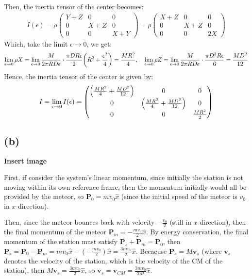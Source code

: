 \documentclass{article}
\DeclarePairedDelimiter{\paran}{(}{)}%
\newcommand{\bv}{\textbf{v}} %
\newcommand{\bP}{\textbf{P}} %
\begin{document}
Then, the inertia tensor of the center becomes:
\begin{align}
    I(\epsilon)=\rho\begin{pmatrix}
        Y+Z&0&0\\
        0&X+Z&0\\
        0&0&X+Y
    \end{pmatrix}=\rho\begin{pmatrix}
        X+Z&0&0\\
        0&X+Z&0\\
        0&0&2X
    \end{pmatrix}
\end{align}
Which, take the limit $\epsilon\rightarrow 0$, we get:
\begin{align}
    \lim_{\epsilon\rightarrow 0}\rho X=\lim_{\epsilon\rightarrow 0}\frac{M}{2\pi RD\epsilon}\cdot \frac{\pi DR\epsilon}{2}\paran*{R^2+\frac{\epsilon^2}{4}}=\frac{MR^2}{4},\quad \lim_{\epsilon\rightarrow 0}\rho Z=\lim_{\epsilon\rightarrow 0}\frac{M}{2\pi RD\epsilon}\cdot\frac{\pi D^3R\epsilon}{6}=\frac{MD^2}{12}
\end{align}
Hence, the inertia tensor of the center is given by:
\begin{align}
    I = \lim_{\epsilon\rightarrow 0}I(\epsilon) = \begin{pmatrix}
        \paran*{\frac{MR^2}{4}+\frac{MD^2}{12}}&0&0\\
        0&\paran*{\frac{MR^2}{4}+\frac{MD^2}{12}}&0\\
        0&0& \frac{MR^2}{2}
    \end{pmatrix}
\end{align}


\subsection*{(b)}
\textbf{Insert image}

First, if consider the system's linear momentum, since initially the station is not moving within its own reference frame, then the momentum initially would all be provided by the meteor, so $\bP_0 = mv_0\hat{x}$ (since the initial speed of the meteor is $v_0$ in $x$-direction).

Then, since the meteor bounces back with velocity $-\frac{v_0}{2}$ (still in $x$-direction), then the final momentum of the meteor $\bP_m = -\frac{mv_0}{2}\hat{x}$. By energy conservation, the final momentum of the station must satisfy $\bP_s + \bP_m = \bP_0$, then $\bP_s = \bP_0-\bP_m = mv_0\hat{x}-(-\frac{mv_0}{2})\hat{x} = \frac{3mv_0}{2}\hat{x}$. Becacuse $\bP_s= M\bv_s$ (where $\bv_s$ denotes the velocity of the station, which is the velocity of the CM of the station), then $M\bv_s = \frac{3mv_0}{2}\hat{x}$, so $\bv_s = \bv_{CM} = \frac{3mv_0}{2M}\hat{x}$.
\end{document}
